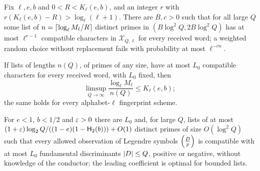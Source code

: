 \begin{theorem}\label{dir:thm:fingerprint}
Fix $\ell,e,b$ and $0<R<K_\ell(e,b)$, and an integer $r$ with $r(K_\ell(e,b)-R)>\log_\ell(\ell+1)$. There are
$B,c>0$ such that for all large $Q$ some list of $n=\lceil\log_\ell M_\ell/R\rceil$ distinct primes in
$(B\log^2Q,2B\log^2Q)$ has at most $\ell^{r-1}$ compatible characters in $\mathcal X_{Q,\ell}$ for every received
word; a weighted random choice without replacement fails with probability at most $\ell^{-cn}$.
\end{theorem}

\begin{theorem}\label{dir:thm:fingerprintconverse}
If lists of lengths $n(Q)$, of primes of any size, have at most $L_0$ compatible characters for every
received word, with $L_0$ fixed, then
\[
 \limsup_{Q\to\infty}\frac{\log_\ell M_\ell}{n(Q)}\le K_\ell(e,b);
\]
the same holds for every alphabet-$\ell$ fingerprint scheme.
\end{theorem}

\begin{corollary}\label{dir:cor:fingerprint}
For $e<1$, $b<1/2$ and $\varepsilon>0$ there are $L_0$ and, for large $Q$, lists of at most
$(1+\varepsilon)\log_2Q/((1-e)(1-\mathsf H_2(b)))+O(1)$ distinct primes of size $O(\log^2Q)$ such that every allowed
observation of Legendre symbols $\Bigl(\frac{D}{p}\Bigr)$ is compatible with at most $L_0$ fundamental discriminants
$\lvert D\rvert\le Q$, positive or negative, without knowledge of the conductor; the leading coefficient is optimal
for bounded lists.
\end{corollary}

